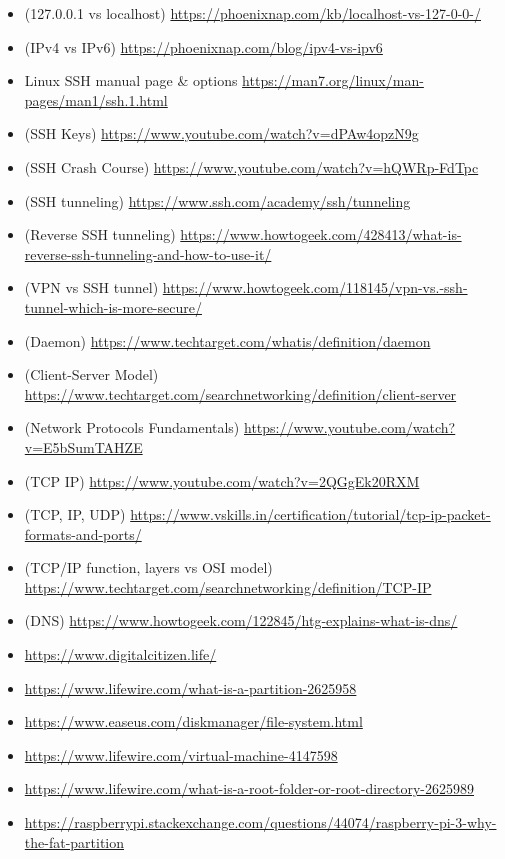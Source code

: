 \documentclass[a4paper, 10pt]{article}
\begin{document}
\begin{itemize}
        \item (127.0.0.1 vs localhost) \url{https://phoenixnap.com/kb/localhost-vs-127-0-0-/}
        \item (IPv4 vs IPv6) \url{https://phoenixnap.com/blog/ipv4-vs-ipv6}
        \item Linux SSH manual page & options \url{https://man7.org/linux/man-pages/man1/ssh.1.html}
        \item (SSH Keys) \url{https://www.youtube.com/watch?v=dPAw4opzN9g}
        \item (SSH Crash Course) \url{https://www.youtube.com/watch?v=hQWRp-FdTpc}
        \item (SSH tunneling) \url{https://www.ssh.com/academy/ssh/tunneling}
        \item (Reverse SSH tunneling) \url{https://www.howtogeek.com/428413/what-is-reverse-ssh-tunneling-and-how-to-use-it/}
        \item (VPN vs SSH tunnel) \url{https://www.howtogeek.com/118145/vpn-vs.-ssh-tunnel-which-is-more-secure/}
        \item (Daemon) \url{https://www.techtarget.com/whatis/definition/daemon}
        \item (Client-Server Model) \url{https://www.techtarget.com/searchnetworking/definition/client-server}
        \item (Network Protocols Fundamentals) \url{https://www.youtube.com/watch?v=E5bSumTAHZE}
        \item (TCP IP) \url{https://www.youtube.com/watch?v=2QGgEk20RXM}
        \item (TCP, IP, UDP) \url{https://www.vskills.in/certification/tutorial/tcp-ip-packet-formats-and-ports/}
        \item (TCP/IP function, layers vs OSI model) \url{https://www.techtarget.com/searchnetworking/definition/TCP-IP}
        \item (DNS) \url{https://www.howtogeek.com/122845/htg-explains-what-is-dns/}
        \item \url{https://www.digitalcitizen.life/}
        \item \url{https://www.lifewire.com/what-is-a-partition-2625958}
        \item \url{https://www.easeus.com/diskmanager/file-system.html}
        \item \url{https://www.lifewire.com/virtual-machine-4147598}
        \item \url{https://www.lifewire.com/what-is-a-root-folder-or-root-directory-2625989}
        \item \url{https://raspberrypi.stackexchange.com/questions/44074/raspberry-pi-3-why-the-fat-partition}

\end{itemize}
\end{document}
